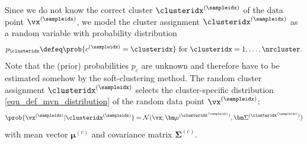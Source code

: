 \documentclass[12pt]{report}
\begin{document}
Since we do not know the correct cluster $\clusteridx^{(\sampleidx)}$ of the data point $\vx^{(\sampleidx)}$, we model the 
cluster assignment $\clusteridx^{(\sampleidx)}$ as a random variable with probability distribution  
\begin{equation} 
\label{equ_def_cluster_prob}
p_{\clusteridx} \defeq \prob{c^{(\sampleidx)}=\clusteridx} \mbox{ for } \clusteridx=1,\ldots,\nrcluster.
\end{equation}  
Note that the (prior) probabilities $p_{c}$ are unknown and therefore have to be estimated somehow by the soft-clustering method. 
The random cluster assignment $\clusteridx^{(\sampleidx)}$ selects the cluster-specific distribution \eqref{equ_def_mvn_distribution} of the random 
data point $\vx^{(\sampleidx)}$: %
\begin{equation}
\label{equ_cond_dist_GMM}
 \prob{\vx^{(\sampleidx)} | \clusteridx^{(\sampleidx)} } = \mathcal{N} (\vx; {\bm \mu}^{(\clusteridx^{(\sampleidx)})}, {\bm \Sigma}^{(\clusteridx^{(\sampleidx)})})
\end{equation} 
with mean vector ${\bm \mu}^{(c)}$ and covariance matrix ${\bm \Sigma}^{(c)}$. 
\end{document}
